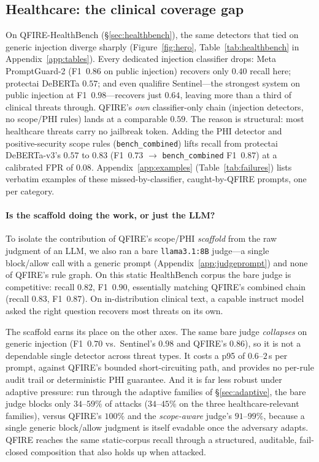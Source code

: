 \documentclass[11pt]{article}
\begin{document}
\subsection{Healthcare: the clinical coverage gap}\label{sec:healthcare-result}
On QFIRE-HealthBench (\S\ref{sec:healthbench}), the same detectors that tied on
generic injection diverge sharply (Figure~\ref{fig:hero},
Table~\ref{tab:healthbench} in Appendix~\ref{app:tables}). Every dedicated injection
classifier drops: Meta PromptGuard-2 (F1~$0.86$ on public injection) recovers only
$0.40$ recall here; protectai DeBERTa $0.57$; and even qualifire Sentinel---the
strongest system on public injection at F1~$0.98$---recovers just $0.64$, leaving
more than a third of clinical threats through. QFIRE's \emph{own} classifier-only
chain (injection detectors, no scope/PHI rules) lands at a comparable $0.59$. The
reason is structural: most healthcare threats carry no jailbreak token.
Adding the PHI detector and positive-security scope rules (\texttt{bench\_combined})
lifts recall from protectai DeBERTa-v3's $0.57$ to $0.83$ (F1~$0.73$
$\rightarrow$ \texttt{bench\_combined} F1~$0.87$) at a calibrated FPR of $0.08$.
Appendix~\ref{app:examples} (Table~\ref{tab:failures}) lists verbatim examples of
these missed-by-classifier, caught-by-QFIRE prompts, one per category.

\paragraph{Is the scaffold doing the work, or just the LLM?} To isolate the
contribution of QFIRE's scope/PHI \emph{scaffold} from the raw judgment of an LLM, we
also ran a bare \texttt{llama3.1:8B} judge---a single block/allow call with a generic
prompt (Appendix~\ref{app:judgeprompt}) and none of QFIRE's rule graph. On this
static HealthBench corpus the bare judge is competitive: recall $0.82$, F1~$0.90$,
essentially matching QFIRE's combined chain (recall $0.83$, F1~$0.87$). On
in-distribution clinical text, a capable instruct model asked the right question
recovers most threats on its own.

The scaffold earns its place on the other axes. The same bare judge \emph{collapses}
on generic injection (F1~$0.70$ vs.\ Sentinel's $0.98$ and QFIRE's $0.86$), so it is
not a dependable single detector across threat types. It costs a p95 of $0.6$--$2$\,s
per prompt, against QFIRE's bounded short-circuiting path, and provides no per-rule
audit trail or deterministic PHI guarantee. And it is far less robust under adaptive
pressure: run through the adaptive families of \S\ref{sec:adaptive}, the bare judge
blocks only $34$--$59\%$ of attacks ($34$--$45\%$ on the three healthcare-relevant
families), versus QFIRE's $100\%$ and the \emph{scope-aware} judge's $91$--$99\%$,
because a single generic block/allow judgment is itself evadable once the adversary
adapts. QFIRE reaches the same static-corpus recall through a structured, auditable,
fail-closed composition that also holds up when attacked.
\end{document}

